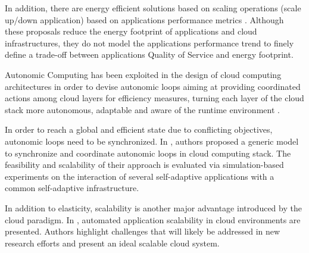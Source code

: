 In addition, there are energy efficient solutions based on scaling operations (scale up/down application) based on applications performance metrics \cite{vaquero_dynamically_2011}.
Although these proposals reduce the energy footprint of applications and cloud infrastructures, they do not model the applications performance trend to finely define a trade-off between applications Quality of Service and energy footprint.

Autonomic Computing has been exploited in the design of cloud computing architectures in order to devise autonomic loops aiming at providing coordinated actions among cloud layers for efficiency measures, turning each layer of the cloud stack more autonomous, adaptable and aware of the runtime environment \cite{alvares_de_oliveira_synchronization_2012} \cite{de_oliveira_self-management_2012}  \cite{de_oliveira_framework_2013}.

In order to reach a global and efficient state due to conflicting objectives, autonomic loops need to be synchronized.
In \cite{alvares_de_oliveira_synchronization_2012}, authors proposed a generic model to synchronize and coordinate autonomic loops in cloud computing stack. 
The feasibility and scalability of their approach is evaluated via simulation-based experiments on the interaction of several self-adaptive applications with a common self-adaptive infrastructure.



In addition to elasticity, scalability is another major advantage introduced by the cloud paradigm.
In \cite{vaquero_dynamically_2011}, automated application scalability in cloud environments are presented.
Authors highlight challenges that will likely be addressed in new research efforts and present an ideal scalable cloud system.


